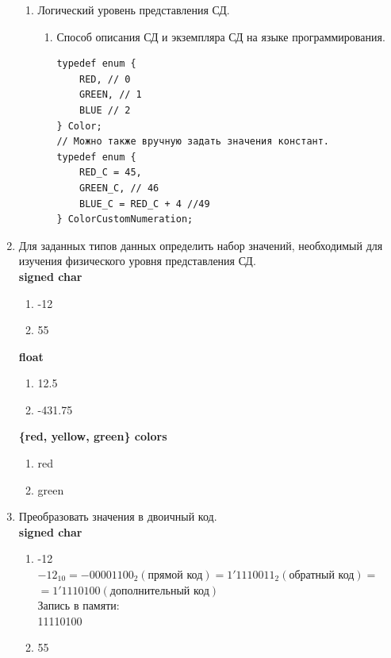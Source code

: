\documentclass[a4paper,14pt]{extarticle}
\begin{document}
\begin{enumerate}
\begin{enumerate}[label*=\arabic*.]
		      \item Логический уровень представления СД.
		            \begin{enumerate}[label*=\arabic*.]
			            \item Способ описания СД и экземпляра СД на языке программирования.
			                  \begin{verbatim}
typedef enum {
    RED, // 0
    GREEN, // 1
    BLUE // 2
} Color;
// Можно также вручную задать значения констант.
typedef enum {
    RED_C = 45, 
    GREEN_C, // 46
    BLUE_C = RED_C + 4 //49
} ColorCustomNumeration;
					  \end{verbatim}
		            \end{enumerate}
	      \end{enumerate}
	\item Для заданных типов данных определить набор значений, необходимый
	      для изучения физического уровня представления СД.\\
	      \textbf{signed char}
	      \begin{enumerate}[1. ]
		      \item -12
		      \item 55
	      \end{enumerate}
	      \textbf{float}
	      \begin{enumerate}[1. ]
		      \item 12.5
		      \item -431.75
	      \end{enumerate}
	      \textbf{\{red, yellow, green\} colors}
	      \begin{enumerate}[1. ]
		      \item red
		      \item green
	      \end{enumerate}
	\item Преобразовать значения в двоичный код.\\
	      \textbf{signed char}
	      \begin{enumerate}[1. ]
		      \item -12\\
		            $-12_{10} = -00001100_2 (\textit{прямой код}) = 1'1110011_2 (\textit{обратный код}) = $\\$ = 1'1110100 (\textit{дополнительный код})$\\
		            Запись в памяти:\\
		            11110100
		      \item 55\\

\end{enumerate}
\end{enumerate}
\end{document}
